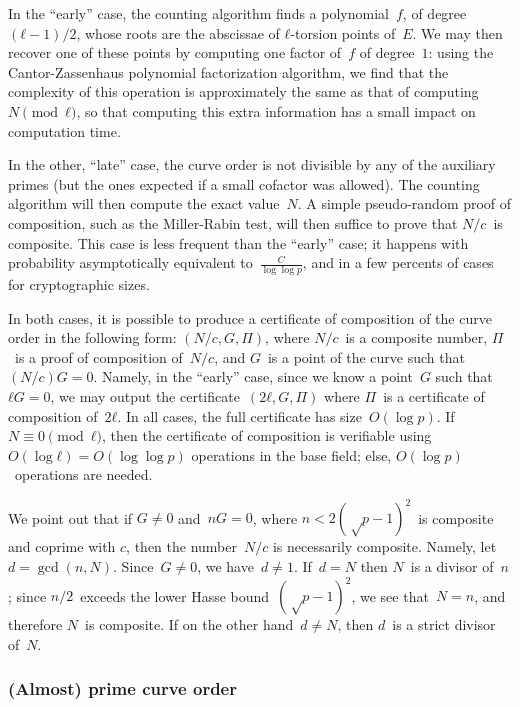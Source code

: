 \documentclass[twocolumn,letterpaper]{article}
\begin{document}
In the “early” case,
the counting algorithm finds a polynomial~$f$, of degree~$(ℓ-1)/2$,
whose roots are the abscissae of $ℓ$-torsion points of~$E$.
We may then recover one of these points by
computing one factor of~$f$ of degree~$1$:
using the Cantor-Zassenhaus polynomial factorization algorithm,
we find that the complexity of this operation
is approximately the same as that of computing~$N \pmod{ℓ}$,
so that computing this extra information
has a small impact on computation time.

\smallskip

In the other, “late” case, the curve order is not divisible
by any of the auxiliary primes (but the ones expected if
a small cofactor was allowed).
The counting algorithm will then compute the exact value~$N$.
A simple pseudo-random proof of composition,
such as the Miller-Rabin test,
will then suffice to prove that $N/c$~is composite.
This case is less frequent than the “early” case;
it happens with probability
asymptotically equivalent to~$\frac{C}{\log \log p}$,
and in a few percents of cases for cryptographic sizes.

\smallskip

In both cases, it is possible to produce a certificate of composition
of the curve order in the following form: $(N/c, G, Π)$,
where $N/c$~is a composite number,%
$Π$~is a proof of composition of~$N/c$,
and $G$~is a point of the curve such that~$(N/c) G = 0$.
Namely, in the “early” case, since we know a point~$G$ such that~$ℓ G = 0$,
we may output the certificate~$(2 ℓ, G, Π)$
where $Π$~is a certificate of composition of~$2 ℓ$.
In all cases, the full certificate has size~$O(\log p)$.
If $N ≡ 0 \pmod{ℓ}$, then the certificate of composition
is verifiable using~$O(\log ℓ) = O(\log \log p)$ operations in the base field;
else, $O(\log p)$~operations are needed.

We point out that if $G ≠ 0$ and~$n G = 0$, where
$n < 2 (√p-1)^2$~is composite and coprime with $c$,
then the number~$N/c$ is necessarily composite.
Namely, let~$d = \gcd(n, N)$. Since~$G ≠ 0$, we have~$d ≠ 1$.
If~$d = N$ then $N$~is a divisor of~$n$;
since $n/2$~exceeds the lower Hasse bound~$(√p-1)^2$,
we see that~$N = n$, and therefore $N$~is composite.
If on the other hand~$d ≠ N$, then $d$~is a strict divisor of~$N$.

\subsubsection{(Almost) prime curve order}
\end{document}
